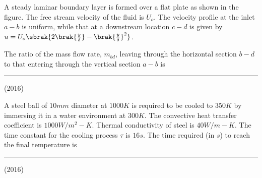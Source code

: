 \item A steady laminar boundary layer is formed over a flat plate as shown in the figure. The free stream velocity of the fluid is $U_{o}$. The velocity profile at the inlet $a-b$ is uniform, while that at a downstream location $c-d$ is given by $u=U_{o}\sbrak{2\brak{\frac{y}{\delta}}-\brak{\frac{y}{\delta}}^{2}}$.


The ratio of the mass flow rate, $m_{bd}$, leaving through the horizontal section $b-d$ to that entering through the vertical section $a-b$ is \rule{1cm}{0.15mm}\hfill(2016)


\item A steel ball of $10mm$ diameter at $1000K$ is required to be cooled to $350K$ by immersing it in a water environment at $300K$. The convective heat transfer coefficient is $1000 W/m^{2}-K$. Thermal conductivity of steel is $40W/m-K$. The time constant for the cooling process $\tau$ is $16s$. The time required (in $s$) to reach the final temperature is \rule{1cm}{0.15mm}\hfill(2016)